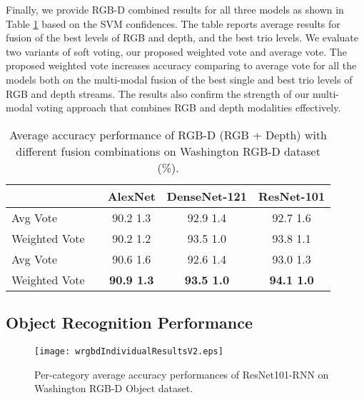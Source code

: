 \documentclass[10pt,journal,compsoc]{IEEEtran}
\begin{document}
Finally, we provide RGB-D combined results for all three models as shown in Table \ref{table:rgbdFusions} based on the SVM confidences. The table reports average results for fusion of the best levels of RGB and depth, and the best trio levels. We evaluate two variants of soft voting, our proposed weighted vote and average vote. The proposed weighted vote increases accuracy comparing to average vote for all the models both on the multi-modal fusion of the best single and best trio levels of RGB and depth streams. The results also confirm the strength of our multi-modal voting approach that combines RGB and depth modalities effectively.
\begin{table}[!h]
\caption{Average accuracy performance of RGB-D (RGB + Depth) with different fusion combinations on Washington RGB-D dataset (\%).}  
	\label{table:rgbdFusions}    
	\centering
	\setlength{\tabcolsep}{0.9em} \def\arraystretch{1.2}
	\begin{adjustbox}{width=\columnwidth}
		\begin{tabular}{llccc}
		\hline
						&								       																				& AlexNet 						  & DenseNet-121 					& ResNet-101 				\\ \hline \hline
		Avg Vote 		&           		& 90.2  1.3        	  & 92.9  1.4           	& 92.7  1.6         \\
		Weighted Vote 	&      			   	& 90.2  1.2        	  & 93.5  1.0          	& 93.8  1.1          \\
		Avg Vote 		&   & 90.6  1.6        	  & 92.6  1.4          	& 93.0  1.3           \\
		Weighted Vote 	&   & \textbf{90.9  1.3}    & \textbf{93.5  1.0}    & \textbf{94.1  1.0} 	 \\ \hline
		\end{tabular}
	\end{adjustbox}
\end{table}


\subsection{Object Recognition Performance} \label{sec:exp.objectRecognition}
\begin{figure*}[t]
	\begin{center}
		\texttt{[image: wrgbdIndividualResultsV2.eps]}
	\end{center}
	\caption{Per-category average accuracy performances of ResNet101-RNN on Washington RGB-D Object dataset.}
	\label{fig:wrgbdIndividualResults}
\end{figure*}
\end{document}
